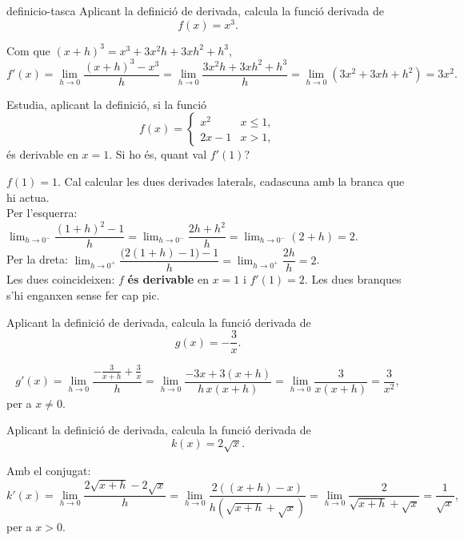 \begin{apartats}

\begin{tria}{definicio-tasca}
Aplicant la definició de derivada, calcula la funció derivada de
\[
f(x)=x^3 .
\]

\begin{solucio}
Com que $(x+h)^3=x^3+3x^2h+3xh^2+h^3$,
\[
f'(x)=\lim_{h\to0}\frac{(x+h)^3-x^3}{h}
=\lim_{h\to0}\frac{3x^2h+3xh^2+h^3}{h}
=\lim_{h\to0}\left(3x^2+3xh+h^2\right)=3x^2 .
\]
\end{solucio}

Estudia, aplicant la definició, si la funció
\[
f(x)=\begin{cases} x^2 & \si{x\le 1},\\[3pt] 2x-1 & \si{x>1},\end{cases}
\]
és derivable en $x=1$. Si ho és, quant val $f'(1)$?

\begin{solucio}
$f(1)=1$. Cal calcular les dues derivades laterals, cadascuna amb la branca que hi actua.\\
Per l'esquerra: $\lim_{h\to0^-}\dfrac{(1+h)^2-1}{h}=\lim_{h\to0^-}\dfrac{2h+h^2}{h}=\lim_{h\to0^-}(2+h)=2$.\\
Per la dreta: $\lim_{h\to0^+}\dfrac{\bigl(2(1+h)-1\bigr)-1}{h}=\lim_{h\to0^+}\dfrac{2h}{h}=2$.\\
Les dues coincideixen: $f$ \textbf{és derivable} en $x=1$ i $f'(1)=2$. Les dues branques s'hi
enganxen sense fer cap pic.
\end{solucio}
\end{tria}

\begin{nomesllarg}
Aplicant la definició de derivada, calcula la funció derivada de
\[
g(x)=-\frac{3}{x} .
\]

\begin{solucio}
\[
g'(x)=\lim_{h\to0}\frac{-\frac{3}{x+h}+\frac{3}{x}}{h}
=\lim_{h\to0}\frac{-3x+3(x+h)}{h\,x(x+h)}
=\lim_{h\to0}\frac{3}{x(x+h)}=\frac{3}{x^2} ,
\]
per a $x\neq0$.
\end{solucio}
\end{nomesllarg}

Aplicant la definició de derivada, calcula la funció derivada de
\[
k(x)=2\sqrt{x} .
\]

\begin{solucio}
Amb el conjugat:
\[
k'(x)=\lim_{h\to0}\frac{2\sqrt{x+h}-2\sqrt{x}}{h}
=\lim_{h\to0}\frac{2\left((x+h)-x\right)}{h\left(\sqrt{x+h}+\sqrt{x}\right)}
=\lim_{h\to0}\frac{2}{\sqrt{x+h}+\sqrt{x}}=\frac{1}{\sqrt{x}} ,
\]
per a $x>0$.
\end{solucio}

\end{apartats}
